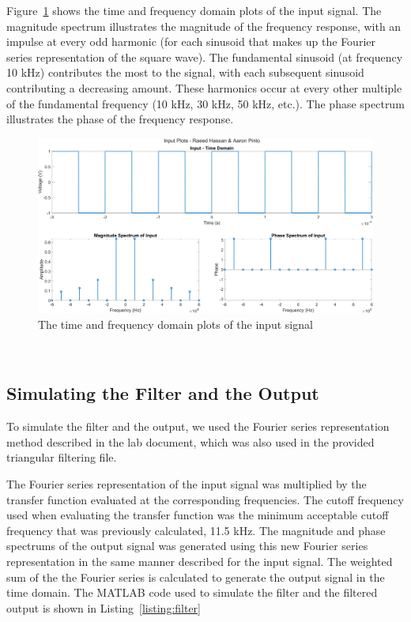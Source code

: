 \documentclass[12pt]{article}
\begin{document}
Figure~\ref{fig:input} shows the time and frequency domain plots of the input signal. The magnitude spectrum illustrates the magnitude of the frequency response, with an impulse at every odd harmonic (for each sinusoid that makes up the Fourier series representation of the square wave). The fundamental sinusoid (at frequency 10 kHz) contributes the most to the signal, with each subsequent sinusoid contributing a decreasing amount. These harmonics occur at every other multiple of the fundamental frequency (10 kHz, 30 kHz, 50 kHz, etc.). The phase spectrum illustrates the phase of the frequency response. %
\begin{figure}[h!]
    \includegraphics[width=\textwidth]{input.png}
    \caption{\label{fig:input} The time and frequency domain plots of the input signal}
\end{figure} \\

\subsection*{Simulating the Filter and the Output}
To simulate the filter and the output, we used the Fourier series representation method described in the lab document, which was also used in the provided triangular filtering file. 

The Fourier series representation of the input signal was multiplied by the transfer function evaluated at the corresponding frequencies. The cutoff frequency used when evaluating the transfer function was the minimum acceptable cutoff frequency that was previously calculated, 11.5 kHz. The magnitude and phase spectrums of the output signal was generated using this new Fourier series representation in the same manner described for the input signal. The weighted sum of the the Fourier series is calculated to generate the output signal in the time domain. The MATLAB code used to simulate the filter and the filtered output is shown in Listing~\ref{listing:filter}

\end{document}
